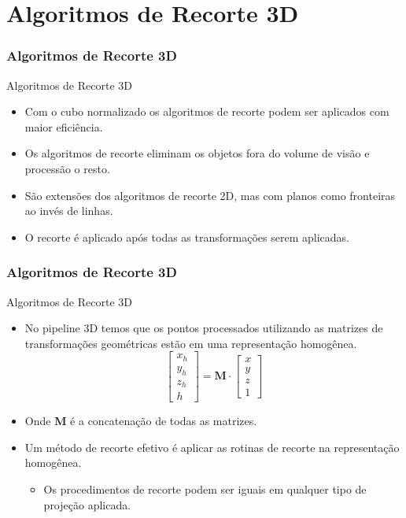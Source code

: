\documentclass{beamer}
\begin{document}
\section{Algoritmos de Recorte 3D}

\begin{frame}
\frametitle{Algoritmos de Recorte 3D}
	\begin{block}{Algoritmos de Recorte 3D}
		\begin{itemize}
			\item Com o cubo normalizado os algoritmos de recorte podem ser aplicados com maior eficiência.
			\item Os algoritmos de recorte eliminam os objetos fora do volume de visão e processão o resto.
			\item São extensões dos algoritmos de recorte 2D, mas com planos como fronteiras ao invés de linhas.
			\item O recorte é aplicado após todas as transformações serem aplicadas.
		\end{itemize}	
	\end{block}
	
\end{frame}


\begin{frame}
\frametitle{Algoritmos de Recorte 3D}
	\begin{block}{Algoritmos de Recorte 3D}
		\begin{itemize}
			\item No pipeline 3D temos que os pontos processados utilizando as matrizes de transformações geométricas estão em uma representação homogênea.
			\begin{equation*}
				\begin{bmatrix}
					x_h \\
					y_h \\
					z_h \\
					h
				\end{bmatrix}
				= \textbf{M} \cdot \begin{bmatrix}
					x \\
					y \\
					z \\
					1
				\end{bmatrix}
			\end{equation*}
			\item Onde \textbf{M} é a concatenação de todas as matrizes.
			\item Um método de recorte efetivo é aplicar as rotinas de recorte na representação homogênea.
			\begin{itemize}
				\item Os procedimentos de recorte podem ser iguais em qualquer tipo de projeção aplicada.
			\end{itemize}
		\end{itemize}	
	\end{block}
	
\end{frame}
\end{document}
